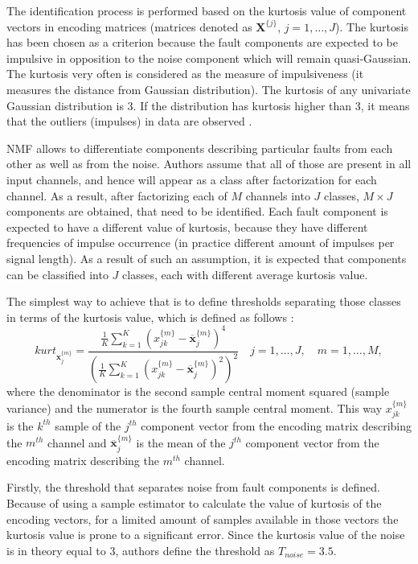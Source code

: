 \documentclass[3p,12pt]{elsarticle}
\begin{document}
The identification process is performed based on the kurtosis value of component vectors in encoding matrices (matrices denoted as $\mathrm{\mathbf{X}}^{\{j\}}$, $j=1,\dots,J$). The kurtosis has been chosen as a criterion because the fault components are expected to be impulsive in opposition to the noise component which will remain quasi-Gaussian. The kurtosis very often is considered as the measure of impulsiveness (it measures the distance from Gaussian distribution). The kurtosis of any univariate Gaussian distribution is 3. If the distribution has kurtosis higher than 3, it means that the outliers (impulses) in data are observed \cite{decarlo1997meaning}.

NMF allows to differentiate components describing particular faults from each other as well as from the noise. Authors assume that all of those are present in all input channels, and hence will appear as a class after factorization for each channel. As a result, after factorizing each of $M$ channels into $J$ classes, $M\times J$ components are obtained, that need to be identified. Each fault component is expected to have a different value of kurtosis, because they have different frequencies of impulse occurrence (in practice different amount of impulses per signal length). As a result of such an assumption, it is expected that components can be classified into $J$ classes, each with different average kurtosis value. 

The simplest way to achieve that is to define thresholds separating those classes in terms of the kurtosis value, which is defined as follows \cite{joanes1998comparing}:
\begin{equation}
\label{eq:kurtosis}
kurt_{\mathbf{x}^{\{m\}}_j}=\frac{\frac{1}{K} \sum_{k=1}^{K} \left(x^{\{m\}}_{jk} - \overline{\mathbf{x}}^{\{m\}}_j \right)^4}{\left({\frac{1}{K} \sum_{k=1}^{K} \left(x^{\{m\}}_{jk} - \overline{\mathbf{x}}^{\{m\}}_j \right)^2}\right)^2}\quad j=1,\dots,J, \quad m=1,\dots,M,
\end{equation}
where the denominator is the second sample central moment squared (sample variance) and the numerator is the fourth sample central moment. This way $x^{\{m\}}_{jk}$ is the $k^{th}$ sample of the $j^{th}$ component vector from the encoding matrix describing the $m^{th}$ channel and $\overline{\mathbf{x}}^{\{m\}}_j$ is the mean of the $j^{th}$ component vector from the encoding matrix describing the $m^{th}$ channel.

Firstly, the threshold that separates noise from fault components is defined. Because of using a sample estimator to calculate the value of kurtosis of the encoding vectors, for a limited amount of samples available in those vectors the kurtosis value is prone to a significant error. Since the kurtosis value of the noise is in theory equal to 3, authors define the threshold as $T_{noise}=3.5$.
\end{document}
